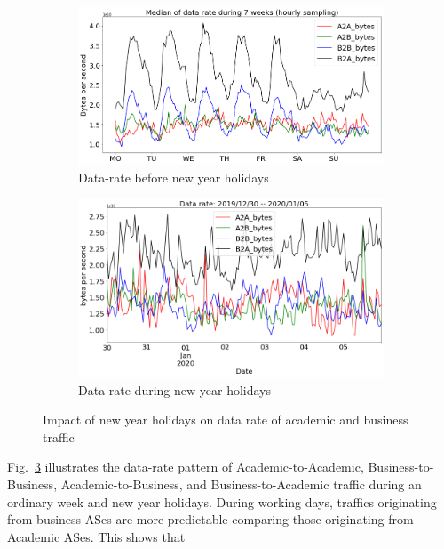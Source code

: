 \documentclass[10pt, journal, letterpaper]{IEEEtran}
\newcommand\figSzeMahdi{0.8}
\begin{document}
\begin{figure}[hbt!]
    \centering
    \begin{subfigure}{\figSzeMahdi\columnwidth}
          \centering
          \includegraphics[width=\columnwidth]{img/BCH_acaBus_bps.png}
          \caption{Data-rate before new year holidays}
          \label{fig:BCH_acaBus_bps}
    \end{subfigure}
    \begin{subfigure}{\figSzeMahdi\columnwidth}
          \centering
          \includegraphics[width=\columnwidth]{img/CH2_acaBus_bps.png}
          \caption{Data-rate during new year holidays}
          \label{fig:CH_acaBus_bps}
    \end{subfigure}
    \caption{Impact of new year holidays on data rate of academic and business traffic}
    \label{fig:datarate_acaBus_BCH_CH}
\end{figure}
Fig.~\ref{fig:datarate_acaBus_BCH_CH} illustrates the data-rate pattern of Academic-to-Academic, Business-to-Business, Academic-to-Business, and Business-to-Academic traffic during an ordinary week and new year holidays. During working days, traffics originating from business ASes are more predictable comparing those originating from Academic ASes. This shows that 
\end{document}
